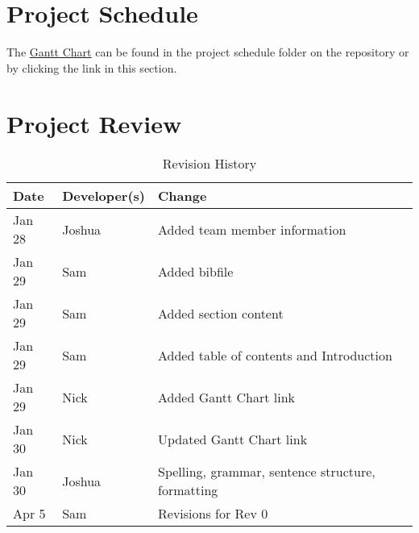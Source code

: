 \documentclass{article}
\begin{document}
\section{Project Schedule}
The \href{https://gitlab.cas.mcmaster.ca/guinnesj/google-images-downloader/blob/master/ProjectSchedule/Gantt-Chart.pdf}{Gantt Chart} can be found in the project schedule folder on the repository or by clicking the link in this section.

\section{Project Review}

\printbibliography{}

\begin{table}[h]
\caption{Revision History} \label{TblRevisionHistory}
\begin{tabularx}{\textwidth}{lll}
\toprule
\textbf{Date} & \textbf{Developer(s)} & \textbf{Change}\\
\midrule
Jan 28 & Joshua & Added team member information\\
Jan 29 & Sam & Added bibfile\\
Jan 29 & Sam & Added section content\\
Jan 29 & Sam & Added table of contents and Introduction\\
Jan 29 & Nick & Added Gantt Chart link\\
Jan 30 & Nick & Updated Gantt Chart link\\
Jan 30 & Joshua & Spelling, grammar, sentence structure, formatting \\
\color{red}Apr 5&\color{red}Sam&\color{red}Revisions for Rev 0\\
\bottomrule
\end{tabularx}
\end{table}
\end{document}
